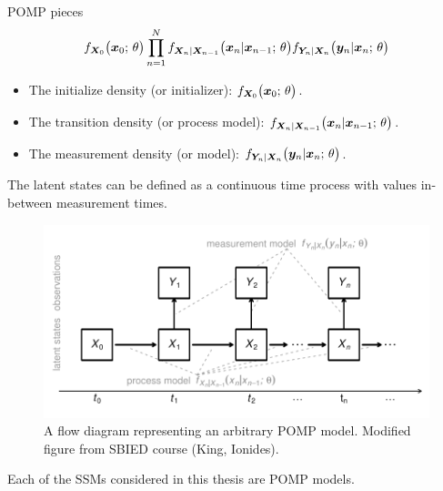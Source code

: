 \documentclass[aspectratio=169]{beamer}\usepackage[]{graphicx}\usepackage[]{xcolor}
\makeatletter
\def\maxwidth{ %
  \ifdim\Gin@nat@width>\linewidth
    \linewidth
  \else
    \Gin@nat@width
  \fi
}
\newenvironment{knitrout}{}{} %
\makeatother
\begin{document}
\begin{frame}{POMP pieces}
  $$
  f_{\bm{X}_0}\big(\bm{x}_0;\, \theta\big)\prod_{n = 1}^N f_{\bm{X}_n|\bm{X}_{n-1}}\big(\bm{x}_{n}|\bm{x}_{n-1}; \, \theta\big)f_{\bm{Y}_n|\bm{X}_{n}}\big(\bm{y}_n|\bm{x}_{n}; \, \theta\big)
  $$
  \begin{itemize}
    \item The initialize density (or initializer): $f_{\bm{X}_0}\big(\bm{x}_0;\, \theta\big)$.
    \item The transition density (or process model): $f_{\bm{X}_n|\bm{X}_{n-1}}\big(\bm{x}_{n}|\bm{x}_{n-1}; \, \theta\big)$. 
    \item The measurement density (or model): $f_{\bm{Y}_n|\bm{X}_{n}}\big(\bm{y}_n|\bm{x}_{n}; \, \theta\big)$.
  \end{itemize}
  The latent states can be defined as a continuous time process with values in-between measurement times. 
\end{frame}

\begin{frame}
\begin{figure}[!ht]
\begin{knitrout}
\color{fgcolor}
\includegraphics[width=0.75\maxwidth]{figure/pompDiagram-1} 
\end{knitrout}
\caption{\label{fig:pompDiagram}A flow diagram representing an arbitrary POMP model. Modified figure from SBIED course (King, Ionides).}
\end{figure}

Each of the SSMs considered in this thesis are POMP models.

\end{frame}
\end{document}

